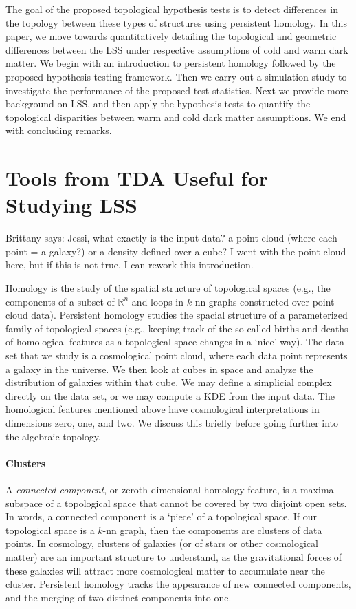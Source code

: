 \documentclass[12pt]{article}
\newcommand{\brittany}[1]{{\color{cyan} Brittany says: #1}}
\begin{document}
The goal of the proposed topological hypothesis tests is to detect differences in the topology between these types of structures using persistent homology. In this paper, we move towards quantitatively detailing the topological and geometric differences between the LSS under respective assumptions of cold and warm dark matter. We begin with an introduction to persistent homology followed by the proposed hypothesis testing framework. Then we carry-out a simulation study to investigate the performance of the proposed test statistics. Next we provide more background on LSS, and then apply the hypothesis tests to quantify the topological disparities between warm and cold dark matter assumptions. We end with concluding remarks.



\section{Tools from TDA Useful for Studying LSS}
\label{sec:tda}
\brittany{Jessi, what exactly is the input data? a point cloud (where each point
    = a galaxy?) or a density
defined over a cube? I went with the point cloud here, but if this is not true,
I can rework this introduction.}

Homology is the study of the spatial structure of topological spaces (e.g., the components of a subset of $\mathbb{R}^n$ and loops in $k$-nn graphs constructed
over point cloud data). Persistent homology studies the spacial structure of a parameterized family of topological spaces (e.g., keeping track of the so-called
births and deaths of homological features as a topological space changes in a `nice' way).
%
The data set that we study is a cosmological point cloud, where each data point represents a galaxy in the universe. We then look at cubes in space and analyze
the distribution of galaxies within that cube. We may define a simplicial complex directly on the data set, or we may compute a KDE from the input data. The homological features mentioned above have cosmological interpretations in dimensions zero, one, and two. We discuss this briefly before going further into the algebraic topology.

\paragraph{Clusters} 
A \emph{connected component}, or zeroth dimensional homology feature, is a maximal subspace of a topological
space that cannot be covered by two disjoint open sets. In words, a connected component is a `piece' of a topological space.  If our topological space is a
$k$-nn graph, then the components are clusters of data points.  In cosmology, clusters of galaxies (or of stars or other cosmological matter) are an important
structure to understand, as the gravitational forces of these galaxies will attract more cosmological matter to accumulate near the cluster. Persistent homology tracks the appearance of new connected components, and the merging of two distinct components into one.
\end{document}
